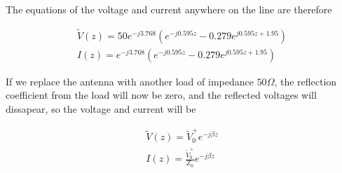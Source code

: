 \documentclass{ximera}
\begin{document}
\begin{example}
\begin{explanation}
The equations of the voltage and current anywhere on the line are therefore

\begin{eqnarray}
\tilde{V}(z)= 50  e^{-j3.768} (e^{-j 0.595 z} - 0.279  e^{j 0.595 z + 1.95}  ) \\
I(z)=   e^{-j3.768}   (e^{-j 0.595 z} - 0.279  e^{j 0.595 z+ 1.95}  ) 
\end{eqnarray}

If we replace the antenna with another load of impedance $50\Omega$, the reflection coefficient from the load will now be zero, and the reflected voltages will dissapear, so the voltage and current will be 


\begin{eqnarray}
\tilde{V}(z)= \tilde{V}_0^+ e^{-j \beta z}   \\
I(z)=   \frac{\tilde{V}_0^+}{Z_0}  e^{-j \beta z} 
\end{eqnarray}


\end{explanation}




\end{example}
\end{document}
